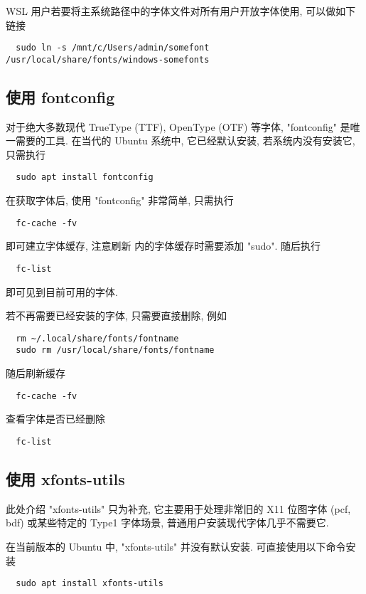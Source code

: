 WSL 用户若要将主系统路径中的字体文件对所有用户开放字体使用,
可以做如下链接
\begin{lstlisting}
  sudo ln -s /mnt/c/Users/admin/somefont /usr/local/share/fonts/windows-somefonts
\end{lstlisting}

\subsection{使用 fontconfig}

对于绝大多数现代 TrueType (TTF),
OpenType (OTF) 等字体,
"fontconfig" 是唯一需要的工具.
在当代的 Ubuntu 系统中,
它已经默认安装,
若系统内没有安装它,
只需执行
\begin{lstlisting}
  sudo apt install fontconfig
\end{lstlisting}

在获取字体后,
使用 "fontconfig" 非常简单,
只需执行
\begin{lstlisting}
  fc-cache -fv
\end{lstlisting}
即可建立字体缓存,
注意刷新  内的字体缓存时需要添加 "sudo".
随后执行
\begin{lstlisting}
  fc-list
\end{lstlisting}
即可见到目前可用的字体.

若不再需要已经安装的字体,
只需要直接删除,
例如
\begin{lstlisting}
  rm ~/.local/share/fonts/fontname
  sudo rm /usr/local/share/fonts/fontname
\end{lstlisting}
随后刷新缓存
\begin{lstlisting}
  fc-cache -fv
\end{lstlisting}
查看字体是否已经删除
\begin{lstlisting}
  fc-list
\end{lstlisting}

\subsection{使用 xfonts-utils}

此处介绍 "xfonts-utils" 只为补充,
它主要用于处理非常旧的 X11 位图字体 (pcf, bdf) 或某些特定的 Type1 字体场景,
普通用户安装现代字体几乎不需要它.

在当前版本的 Ubuntu 中,
"xfonts-utils" 并没有默认安装.
可直接使用以下命令安装
\begin{lstlisting}
  sudo apt install xfonts-utils
\end{lstlisting}

